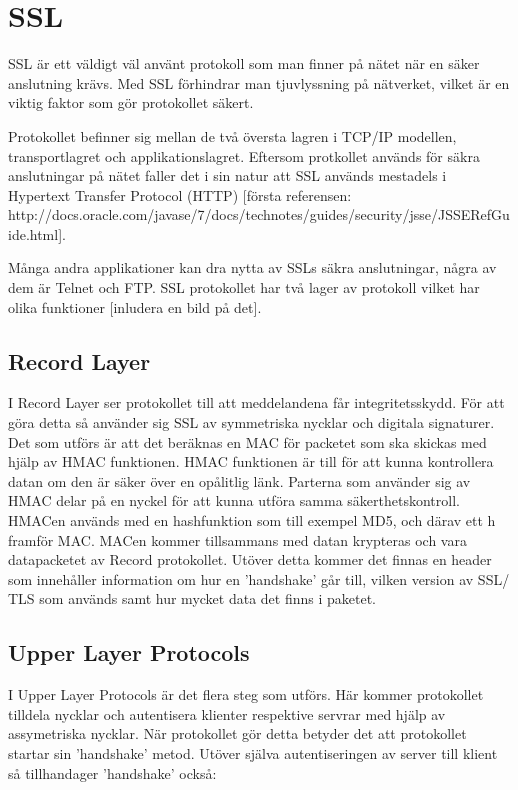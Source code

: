 \section{SSL}
SSL är ett väldigt väl använt protokoll som man finner på nätet när en säker anslutning krävs. Med SSL förhindrar man tjuvlyssning på nätverket, vilket är en viktig faktor som gör protokollet säkert. 

Protokollet befinner sig mellan de två översta lagren i TCP/IP modellen, transportlagret och applikationslagret.
Eftersom protkollet används för säkra anslutningar på nätet faller det i sin natur att SSL används mestadels i Hypertext Transfer Protocol (HTTP) [första referensen: http://docs.oracle.com/javase/7/docs/technotes/guides/security/jsse/JSSERefGuide.html]. 

Många andra applikationer kan dra nytta av SSLs säkra anslutningar, några av dem är Telnet och FTP. 
SSL protokollet har två lager av protokoll vilket har olika funktioner [inludera en bild på det].

\subsection{Record Layer}
I Record Layer ser protokollet till att meddelandena får integritetsskydd. För att göra detta så använder sig SSL av symmetriska nycklar och digitala signaturer. Det som utförs är att det beräknas en MAC för packetet som ska skickas med hjälp av HMAC funktionen. HMAC funktionen är till för att kunna kontrollera datan om den är säker över en opålitlig länk. Parterna som använder sig av HMAC delar på en nyckel för att kunna utföra samma säkerthetskontroll. HMACen används med en hashfunktion som till exempel MD5, och därav ett h framför MAC. MACen kommer tillsammans med datan krypteras och vara datapacketet av Record protokollet. Utöver detta kommer det finnas en header som innehåller information om hur en 'handshake' går till, vilken version av SSL/ TLS som används samt hur mycket data det finns i paketet.

\subsection{Upper Layer Protocols}
I Upper Layer Protocols är det flera steg som utförs. Här kommer protokollet tilldela nycklar och autentisera klienter respektive servrar med hjälp av assymetriska nycklar. När protokollet gör detta betyder det att protokollet startar sin 'handshake' metod. Utöver själva autentiseringen av server till klient så tillhandager 'handshake' också:


